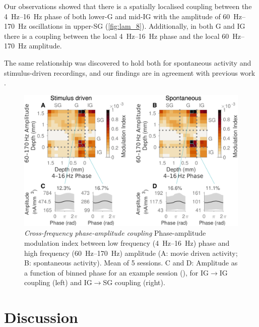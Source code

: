 Our observations showed that there is a spatially localised coupling between the \SIrange{4}{16}{Hz} phase of both lower-\ac{G} and mid-\ac{IG} with the amplitude of \SIrange{60}{170}{Hz} oscillations in upper-\ac{SG} (\autoref{fig:lam_8}).
Additionally, in both \ac{G} and \ac{IG} there is a coupling between the local \SIrange{4}{16}{Hz} phase and the local \SIrange{60}{170}{Hz} amplitude.

The same relationship was discovered to hold both for spontaneous activity and stimulus-driven recordings, and our findings are in agreement with previous work \citep{Spaak2012}.

\begin{figure}[htbp]
\centering \includegraphics[width=\columnwidth]{paperfigs/fig8}
%
\caption{%
\textit{Cross-frequency phase-amplitude coupling}
Phase-amplitude modulation index between low frequency (\SIrange{4}{16}{Hz}) phase and high frequency (\SIrange{60}{170}{Hz}) amplitude (A: movie driven activity; B: spontaneous activity).
Mean of \num{5} sessions.
C and D: Amplitude as a function of binned phase for an example session (), for \ac{IG}$\rightarrow$\ac{IG} coupling (left) and \ac{IG}$\rightarrow$\ac{SG} coupling (right).}%
\label{fig:lam_8}
%
\end{figure}


\section{Discussion}

